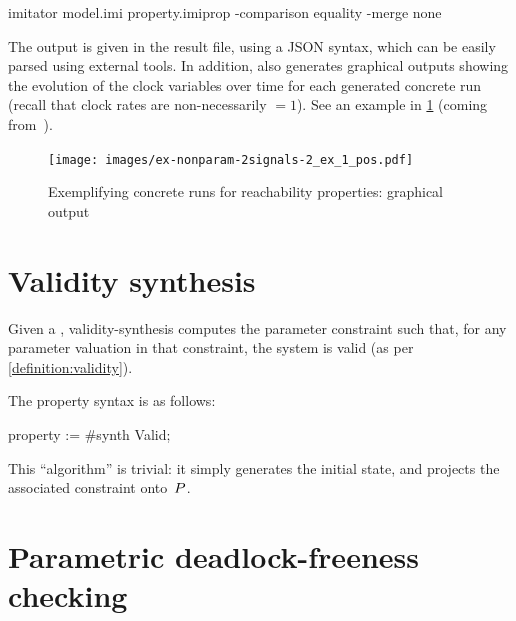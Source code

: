 \begin{terminal}
imitator model.imi property.imiprop -comparison equality -merge none
\end{terminal}

The output is given in the result file, using a JSON syntax, which can be easily parsed using external tools.
In addition, \imitator{} also generates graphical outputs showing the evolution of the clock variables over time for each generated concrete run (recall that clock rates are non-necessarily $=1$).
See an example in \cref{figure:figex2signals2:1} (coming from~\cite{AWUH22}).

\begin{figure}[tb]
	\centering
	\texttt{[image: images/ex-nonparam-2signals-2\_ex\_1\_pos.pdf]}
	\caption{Exemplifying concrete runs for reachability properties: graphical output}
	\label{figure:figex2signals2:1}
\end{figure}



\section{Validity synthesis}\label{section:algorithm:validity}

Given a \NIPTA{}, validity-synthesis computes the parameter constraint such that, for any parameter valuation in that constraint, the system is valid (as per \cref{definition:validity}).

The property syntax is as follows:

\begin{IMITATORproperty}
property := #synth Valid;
\end{IMITATORproperty}

This ``algorithm'' is trivial: it simply generates the initial state, and projects the associated constraint onto~$P$.



\section{Parametric deadlock-freeness checking}\label{section:algorithm:PDFC}

